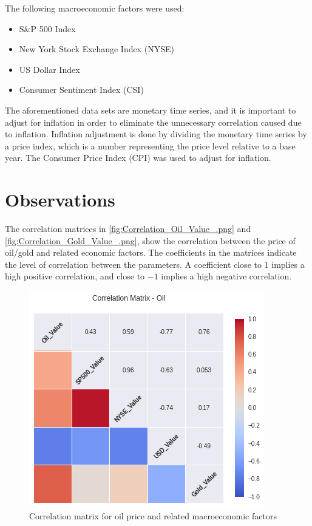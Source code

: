 \documentclass[runningheads]{llncs}
\begin{document}
The following macroeconomic factors were used:

\begin {itemize}
\item S\&P 500 Index \cite{quandal}
\item New York Stock Exchange Index (NYSE) \cite{quandal}
\item US Dollar Index \cite{quandal}
\item Consumer Sentiment Index (CSI) \cite{csi}
\end {itemize}


\noindent The aforementioned data sets are monetary time series, and it is important to adjust for inflation in order to eliminate the unnecessary correlation caused due to inflation. Inflation adjustment is done by dividing the monetary time series by a price index, which is a number representing the price level relative to a base year. The Consumer Price Index (CPI) was used to adjust for inflation.

\newpage

\section{Observations}

\noindent The correlation matrices in \autoref{fig:Correlation_Oil_Value_.png} and \autoref{fig:Correlation_Gold_Value_.png}, show the correlation between the price of oil/gold and related economic factors. The coefficients in the matrices indicate the level of correlation between the parameters. A coefficient close to $1$ implies a high positive correlation, and close to  $-1$ implies a high negative correlation. \\

\begin{figure}
\centering
\includegraphics[width=\textwidth]{Correlation_Oil_Value_.png}
\caption{Correlation matrix for oil price and related macroeconomic factors}
\label{fig:Correlation_Oil_Value_.png}
\end{figure}
\end{document}
